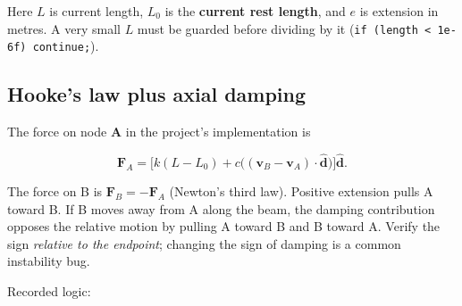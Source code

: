 \documentclass[
  10pt,
  a4paper,
]{article}
\begin{document}
Here \(L\) is current length, \(L_0\) is the \textbf{current rest
length}, and \(e\) is extension in metres. A very small \(L\) must be
guarded before dividing by it
(\texttt{if\ (length\ \textless{}\ 1e-6f)\ continue;}).

\subsection{Hooke's law plus axial
damping}\label{hookes-law-plus-axial-damping}

The force on node \textbf{A} in the project's implementation is

\[
\boxed{\mathbf F_A=\Big[k(L-L_0)+c\big((\mathbf v_B-\mathbf v_A)\cdot\hat{\mathbf d}\big)\Big]\hat{\mathbf d}}.
\]

The force on B is \(\mathbf F_B=-\mathbf F_A\) (Newton's third law).
Positive extension pulls A toward B. If B moves away from A along the
beam, the damping contribution opposes the relative motion by pulling A
toward B and B toward A. Verify the sign \emph{relative to the
endpoint}; changing the sign of damping is a common instability bug.

Recorded logic:
\end{document}

